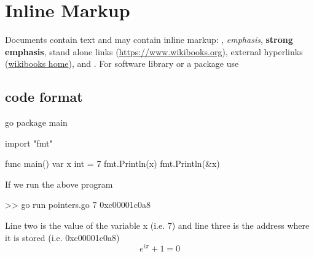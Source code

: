 \documentclass[12pt,a4paper]{report}
\begin{document}
%
\section{Inline Markup}
Documents contain text and may contain inline markup: , \emph{emphasis}, \textbf{strong emphasis}, stand alone links (\url{https://www.wikibooks.org}), external hyperlinks (\href{https://www.wikibooks.org}{wikibooks home}), and . For software library or a package use 
\lipsum[1]



\subsection{code format}

%
\begin{code}{go}
package main

import "fmt"

func main() {
  var x int = 7
  fmt.Println(x)
  fmt.Println(&x)
}
\end{code}
%
If we run the above program
\begin{literal}
>> go run pointers.go
7
0xc00001c0a8
\end{literal}
%
Line two is the value of the variable x (i.e. 7) and line three is the address where it is stored (i.e. 0xc00001c0a8)
\begin{equation}
  e^{i\pi}+1=0
  \label{eqn:euler}
\end{equation}
\end{document}
